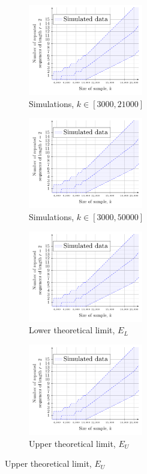 \documentclass[varwidth,border=10pt]{standalone}
\begin{document}
\begin{figure}
\centering
\begin{subfigure}{6cm}
\centering\includegraphics[width=5cm,page=1]{SubFigures.pdf}
\caption{Simulations, $k\in[3000,21000]$}
\end{subfigure}%
\begin{subfigure}{6cm}
\centering\includegraphics[width=5cm,page=2]{SubFigures.pdf}
\caption{Simulations, $k\in[3000,50000]$}
\end{subfigure}\vspace{10pt}
 
\begin{subfigure}{6cm}
\centering\includegraphics[width=5cm,page=4]{SubFigures.pdf}
\caption{Lower theoretical limit, $E_L$}
\end{subfigure}%
\begin{subfigure}{6cm}
\centering\includegraphics[width=5cm,page=3]{SubFigures.pdf}
\caption{Upper theoretical limit, $E_U$}
\end{subfigure}
\end{figure}
\end{document}

